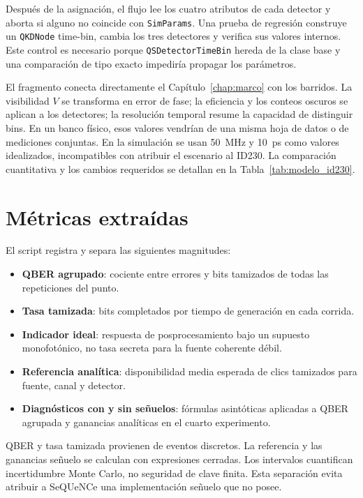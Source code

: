 Después de la asignación, el flujo lee los cuatro atributos de cada detector y aborta si alguno no coincide con \texttt{SimParams}. Una prueba de regresión construye un \texttt{QKDNode} time-bin, cambia los tres detectores y verifica sus valores internos. Este control es necesario porque \texttt{QSDetectorTimeBin} hereda de la clase base y una comparación de tipo exacto impediría propagar los parámetros.

El fragmento conecta directamente el Capítulo~\ref{chap:marco} con los barridos. La visibilidad \(V\) se transforma en error de fase; la eficiencia y los conteos oscuros se aplican a los detectores; la resolución temporal resume la capacidad de distinguir bins. En un banco físico, esos valores vendrían de una misma hoja de datos o de mediciones conjuntas. En la simulación se usan \SI{50}{\mega\hertz} y \SI{10}{\pico\second} como valores idealizados, incompatibles con atribuir el escenario al ID230. La comparación cuantitativa y los cambios requeridos se detallan en la Tabla~\ref{tab:modelo_id230}.

\section{Métricas extraídas}

El script registra y separa las siguientes magnitudes:

\begin{itemize}
  \item \textbf{QBER agrupado}: cociente entre errores y bits tamizados de todas las repeticiones del punto.
  \item \textbf{Tasa tamizada}: bits completados por tiempo de generación en cada corrida.
  \item \textbf{Indicador ideal}: respuesta de posprocesamiento bajo un supuesto monofotónico, no tasa secreta para la fuente coherente débil.
  \item \textbf{Referencia analítica}: disponibilidad media esperada de clics tamizados para fuente, canal y detector.
  \item \textbf{Diagnósticos con y sin señuelos}: fórmulas asintóticas aplicadas a QBER agrupada y ganancias analíticas en el cuarto experimento.
\end{itemize}

QBER y tasa tamizada provienen de eventos discretos. La referencia y las ganancias señuelo se calculan con expresiones cerradas. Los intervalos cuantifican incertidumbre Monte Carlo, no seguridad de clave finita. Esta separación evita atribuir a SeQUeNCe una implementación señuelo que no posee.


